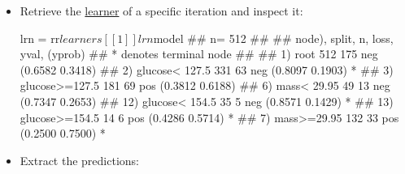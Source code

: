 \documentclass[
  11pt,
  parskip=half,
  DIV=calc,
  BCOR=10mm,
  x11names]{scrbook}
\newenvironment{Shaded}{}{}
\newcommand{\DecValTok}[1]{#1}
\newcommand{\KeywordTok}[1]{\textcolor[rgb]{0.00,0.00,1.00}{#1}}
\newcommand{\NormalTok}[1]{#1}
\newcommand{\OperatorTok}[1]{#1}
\newcommand{\StringTok}[1]{\textcolor[rgb]{0.00,0.50,0.50}{#1}}
\begin{document}
\begin{itemize}
\begin{Shaded}
\end{Shaded}
\item
  Retrieve the \protect\hyperlink{learners}{learner} of a specific iteration and inspect it:

\begin{Shaded}
\begin{Highlighting}[]
\NormalTok{lrn =}\StringTok{ }\NormalTok{rr}\OperatorTok{$}\NormalTok{learners[[}\DecValTok{1}\NormalTok{]]}
\NormalTok{lrn}\OperatorTok{$}\NormalTok{model}
\NormalTok{## n= 512 }
\NormalTok{## }
\NormalTok{## node), split, n, loss, yval, (yprob)}
\NormalTok{##       * denotes terminal node}
\NormalTok{## }
\NormalTok{##  1) root 512 175 neg (0.6582 0.3418)  }
\NormalTok{##    2) glucose< 127.5 331  63 neg (0.8097 0.1903) *}
\NormalTok{##    3) glucose>=127.5 181  69 pos (0.3812 0.6188)  }
\NormalTok{##      6) mass< 29.95 49  13 neg (0.7347 0.2653)  }
\NormalTok{##       12) glucose< 154.5 35   5 neg (0.8571 0.1429) *}
\NormalTok{##       13) glucose>=154.5 14   6 pos (0.4286 0.5714) *}
\NormalTok{##      7) mass>=29.95 132  33 pos (0.2500 0.7500) *}
\end{Highlighting}
\end{Shaded}
\item
  Extract the predictions:


\end{itemize}
\end{document}
